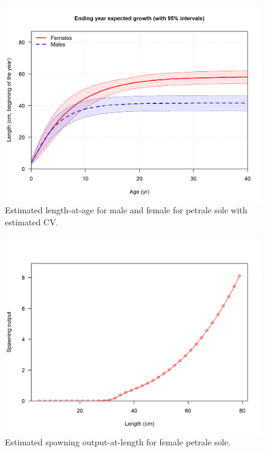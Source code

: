 \documentclass[12pt,]{article}
\begin{document}
\FloatBarrier

\begin{figure}
\centering
\includegraphics{r4ss/plots_mod1/bio1_sizeatage.png}
\caption{Estimated length-at-age for male and female for petrale sole
with estimated CV. \label{fig:sizeatage}}
\end{figure}

\FloatBarrier 

\begin{figure}
\centering
\includegraphics{r4ss/plots_mod1/bio10_spawningoutput_len.png}
\caption{Estimated spawning output-at-length for female petrale sole.
\label{fig:spawnoutlen}}
\end{figure}
\end{document}
